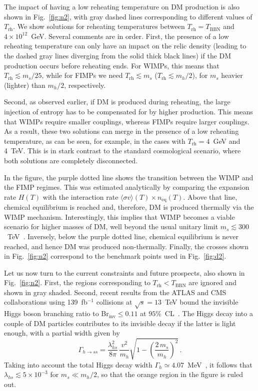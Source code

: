 \documentclass[a4paper,11pt]{article}
\newcommand{\lhs}{\lambda_{hs}}
\newcommand{\mdm}{m_s}
\newcommand{\Trh}{T_\text{rh}}
\newcommand{\sv}{\langle\sigma v\rangle}
\begin{document}
The impact of having a low reheating temperature on DM production is also shown in Fig.~\ref{fig:n2}, with gray dashed lines corresponding to different values of $\Trh$. We show solutions for reheating temperatures between $\Trh = T_\text{BBN}$ and $4 \times 10^{12}$~GeV. Several comments are in order. First, the presence of a low reheating temperature can only have an impact on the relic density (leading to the dashed gray lines diverging from the solid thick black lines) if the DM production occurs before reheating ends. For WIMPs, this means that $\Trh \lesssim \mdm/25$, while for FIMPs we need $\Trh \lesssim \mdm$ ($\Trh \lesssim m_h/2$), for $\mdm$ heavier (lighter) than $m_h/2$, respectively.

Second, as observed earlier, if DM is produced during reheating, the large injection of entropy has to be compensated for by higher production. This means that WIMPs require smaller couplings, whereas FIMPs require larger couplings. As a result, these two solutions can merge in the presence of a low reheating temperature, as can be seen, for example, in the cases with $\Trh = 4$~GeV and 4~TeV. This is in stark contrast to the standard cosmological scenario, where both solutions are completely disconnected.

In the figure, the purple dotted line shows the transition between the WIMP and the FIMP regimes. This was estimated analytically by comparing the expansion rate $H(T)$ with the interaction rate $\sv(T) \times n_\text{eq}(T)$.
Above that line, chemical equilibrium is reached and, therefore, DM is produced thermally via the WIMP mechanism.
Interestingly, this implies that WIMP becomes a viable scenario for higher masses of DM, well beyond the usual unitary limit $\mdm \lesssim 300$~TeV~\cite{Griest:1989wd, Smirnov:2019ngs, Bhatia:2020itt}.
Inversely, below the purple dotted line, chemical equilibrium is never reached, and hence DM was produced non-thermally.
Finally, the crosses shown in Fig.~\ref{fig:n2} correspond to the benchmark points used in Fig.~\ref{fig:d2}.

Let us now turn to the current constraints and future prospects, also shown in Fig.~\ref{fig:n2}.
First, the regions corresponding to $\Trh < T_\text{BBN}$ are ignored and shown in gray shaded.
Second, recent results from the ATLAS and CMS collaborations using 139~fb$^{-1}$ collisions at $\sqrt{s} = 13$~TeV bound the invisible Higgs boson branching ratio to Br$_\text{inv}\leq 0.11$ at $95\%$~CL~\cite{ATLAS:2022yvh, ATLAS:2023tkt, CMS:2023sdw}.
The Higgs decay into a couple of DM particles contributes to its invisible decay if the latter is light enough, with a partial width given by
\begin{equation}
    \Gamma_{h\to ss} = \dfrac{\lhs^2}{8\pi}\, \dfrac{v^2}{m_h} \sqrt{1 - \left(\dfrac{2\, \mdm}{m_h}\right)^2}\,.
\end{equation}
Taking into account the total Higgs decay width $\Gamma_h\simeq 4.07$~MeV~\cite{Djouadi:2005gi, ATLAS:2023tkt}, it follows that $\lhs \lesssim 5\times10^{-3}$ for $\mdm \ll m_h/2$, so that the orange region in the figure is ruled out.
\end{document}
